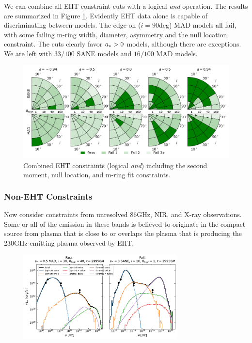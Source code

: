 
We can combine all EHT constraint cuts with a logical {\em and} operation.  The results are summarized in Figure  \ref{fig:all_EHT_constraints}.  Evidently EHT data alone is capable of discriminating between models.   The edge-on ($i = 90$deg) MAD models all fail, with some failing m-ring width, diameter, asymmetry and the null location constraint.  The cuts clearly favor $a_* > 0$ models, although there are exceptions.  We are left with $33/100$ SANE models and $16/100$ MAD models.

\begin{figure}
  \centering
    \includegraphics[width=\textwidth]{./figures/Interferometric_Constraints.png}
  \caption{Combined EHT constraints (logical {\em and}) including the second moment, null location, and m-ring fit constraints.}
  \label{fig:all_EHT_constraints}
\end{figure}

\subsubsection{Non-EHT Constraints}

Now consider constraints from unresolved 86GHz, NIR, and X-ray observations.  Some or all of the emission in these bands is believed to originate in the compact source from plasma that is close to or overlaps the plasma that is producing the 230GHz-emitting plasma observed by EHT.

\begin{figure}
  \centering
  \includegraphics[width=0.75\textwidth]{figures/passfail_sed.pdf}
  \caption{}
  \label{fig:passfail_noneht}
\end{figure}

